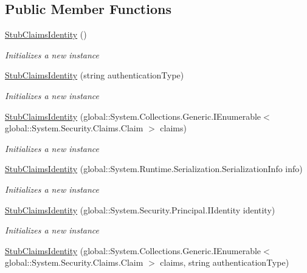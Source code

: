 \subsection*{Public Member Functions}
\begin{DoxyCompactItemize}
\item 
\hyperlink{class_system_1_1_security_1_1_claims_1_1_fakes_1_1_stub_claims_identity_a7361504865b04d4279aecfea50d39154}{Stub\-Claims\-Identity} ()
\begin{DoxyCompactList}\small\item\em Initializes a new instance\end{DoxyCompactList}\item 
\hyperlink{class_system_1_1_security_1_1_claims_1_1_fakes_1_1_stub_claims_identity_a27c90f5ce96137d8eb05df337221ca08}{Stub\-Claims\-Identity} (string authentication\-Type)
\begin{DoxyCompactList}\small\item\em Initializes a new instance\end{DoxyCompactList}\item 
\hyperlink{class_system_1_1_security_1_1_claims_1_1_fakes_1_1_stub_claims_identity_aad73bbc8b788cfa164159984d8108350}{Stub\-Claims\-Identity} (global\-::\-System.\-Collections.\-Generic.\-I\-Enumerable$<$ global\-::\-System.\-Security.\-Claims.\-Claim $>$ claims)
\begin{DoxyCompactList}\small\item\em Initializes a new instance\end{DoxyCompactList}\item 
\hyperlink{class_system_1_1_security_1_1_claims_1_1_fakes_1_1_stub_claims_identity_a2f163ef03a2c680d861f23bd5c73e179}{Stub\-Claims\-Identity} (global\-::\-System.\-Runtime.\-Serialization.\-Serialization\-Info info)
\begin{DoxyCompactList}\small\item\em Initializes a new instance\end{DoxyCompactList}\item 
\hyperlink{class_system_1_1_security_1_1_claims_1_1_fakes_1_1_stub_claims_identity_ab106ca91f1820e436603d6360dd1ef30}{Stub\-Claims\-Identity} (global\-::\-System.\-Security.\-Principal.\-I\-Identity identity)
\begin{DoxyCompactList}\small\item\em Initializes a new instance\end{DoxyCompactList}\item 
\hyperlink{class_system_1_1_security_1_1_claims_1_1_fakes_1_1_stub_claims_identity_a7e3cbf3d1f7c1b22e56ef9d0e43dfb44}{Stub\-Claims\-Identity} (global\-::\-System.\-Collections.\-Generic.\-I\-Enumerable$<$ global\-::\-System.\-Security.\-Claims.\-Claim $>$ claims, string authentication\-Type)

\end{DoxyCompactItemize}
